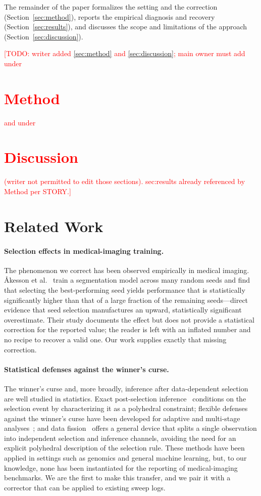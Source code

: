 \documentclass[conference]{IEEEtran}
\newcommand{\todo}[1]{\textcolor{red}{[TODO: #1]}}
\begin{document}
The remainder of the paper formalizes the setting and the correction
(Section~\ref{sec:method}), reports the empirical diagnosis and recovery
(Section~\ref{sec:results}), and discusses the scope and limitations of the
approach (Section~\ref{sec:discussion}).
\todo{writer added \ref{sec:method} and \ref{sec:discussion}; main owner must add \label{sec:method} under \section{Method} and \label{sec:discussion} under \section{Discussion} (writer not permitted to edit those sections). sec:results already referenced by Method per STORY.}

\section{Related Work}

\paragraph{Selection effects in medical-imaging training.}
The phenomenon we correct has been observed empirically in medical imaging.
\AA{}kesson et al.~\cite{akesson2024random} train a segmentation model across many
random seeds and find that selecting the best-performing seed yields performance
that is statistically significantly higher than that of a large fraction of the
remaining seeds---direct evidence that seed selection manufactures an upward,
statistically significant overestimate. Their study documents the effect but does
not provide a statistical correction for the reported value; the reader is left
with an inflated number and no recipe to recover a valid one. Our work supplies
exactly that missing correction.

\paragraph{Statistical defenses against the winner's curse.}
The winner's curse and, more broadly, inference after data-dependent selection
are well studied in statistics. Exact post-selection
inference~\cite{lee2016exact} conditions on the selection event by characterizing
it as a polyhedral constraint; flexible defenses against the winner's curse have
been developed for adaptive and multi-stage analyses~\cite{zrnic2024flexible};
and data fission~\cite{leiner2023datafission} offers a general device that splits
a single observation into independent selection and inference channels, avoiding
the need for an explicit polyhedral description of the selection rule. These
methods have been applied in settings such as genomics and general machine
learning, but, to our knowledge, none has been instantiated for the reporting of
medical-imaging benchmarks. We are the first to make this transfer, and we pair
it with a corrector that can be applied to existing sweep logs.
\end{document}
